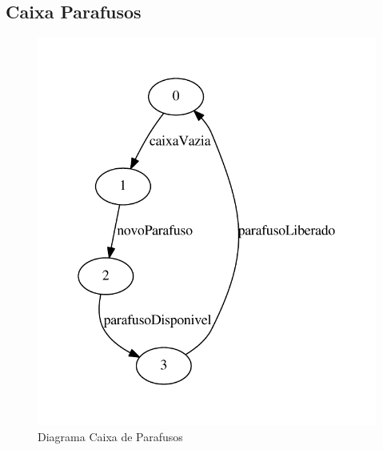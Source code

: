 \documentclass[a4paper,11pt,twocolumns]{article}
\begin{document}
\subsection{Caixa Parafusos}
\begin{figure}[H]
    \centering
    \includegraphics[width = 0.6\linewidth]{./img/g_caixa.pdf}
    \caption{Diagrama Caixa de Parafusos}
    \label{fig:g_caixa}
\end{figure}
\end{document}
